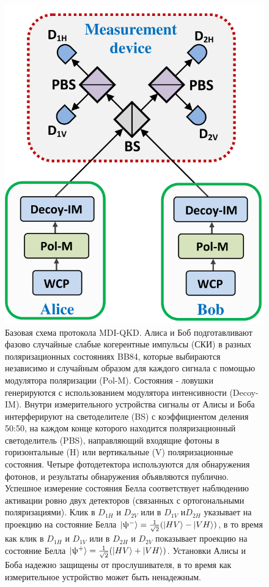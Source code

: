 \begin{figure}
    \centering
    \includegraphics[width=0.7\linewidth]{images/MDi scheme.png}
    \caption{Базовая схема протокола MDI-QKD.
Алиса и Боб подготавливают фазово случайные слабые когерентные импульсы (СКИ) в разных поляризационных состояниях BB84, которые выбираются независимо и случайным образом для каждого сигнала с помощью модулятора поляризации (Pol-M). Состояния - ловушки генерируются с использованием модулятора интенсивности (Decoy-IM). Внутри измерительного устройства сигналы от Алисы и Боба интерферируют на светоделителе  (BS) с коэффициентом деления 50:50, на каждом конце которого находится поляризационный светоделитель (PBS), направляющий входящие фотоны в горизонтальные (H) или вертикальные (V) поляризационные состояния. Четыре фотодетектора используются для обнаружения фотонов, и результаты обнаружения объявляются публично. Успешное измерение состояния Белла соответствует наблюдению активации ровно двух детекторов (связанных с ортогональными поляризациями). Клик в $D_{1H}$ и $D_{2V}$ или в $D_{1V}$ и$D_{2H}$ указывает на проекцию на состояние Белла $\lvert\uppsi^{-}\rangle = \frac{1}{\sqrt{2}}(\lvert HV\rangle - \lvert VH\rangle)$, в то время как клик в $D_{1H}$ и $D_{1V}$ или в $D_{2H}$ и $D_{2V}$ показывает проекцию на состояние Белла $\lvert\uppsi^{+}\rangle = \frac{1}{\sqrt{2}}(\lvert HV\rangle + \lvert VH\rangle)$. Установки Алисы и Боба надежно защищены от прослушивателя, в то время как измерительное устройство может быть ненадежным.
}
\end{figure} \label{fig:MDI scheme lit}
